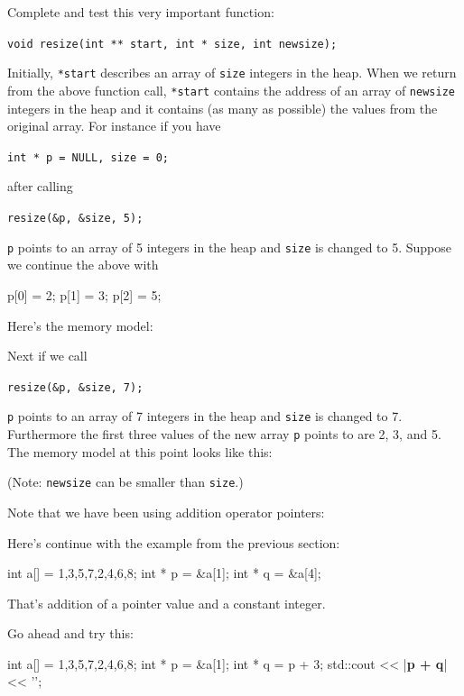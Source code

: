 \begin{ex}
Complete and test this very important function:

\verb!void resize(int ** start, int * size, int newsize);!

Initially, \texttt{*start} describes an array of \texttt{size} integers in
the heap. When we return from the above function call, \texttt{*start}
contains the address of an array of \texttt{newsize} integers in the heap
and it contains (as many as possible) the values from the original
array. For instance if you have

\verb!int * p = NULL, size = 0;!

after calling

\verb!resize(&p, &size, 5);!

\texttt{p} points to an array of 5 integers in the heap and \texttt{size} is
changed to 5. Suppose we continue the above with

\begin{consolethree}[escapeinside=||]
p[0] = 2;
p[1] = 3;
p[2] = 5;
\end{consolethree}

Here's the memory model:

Next if we call

\verb!resize(&p, &size, 7);!

\texttt{p} points to an array of 7 integers in the heap and \texttt{size} is
changed to 7. Furthermore the first three values of the new array
\texttt{p} points to are 2, 3, and 5. The memory model at this point looks
like this:

(Note: \texttt{newsize} can be smaller than \texttt{size}.)
\end{ex}

\newpage{}

Note that we have been using addition operator pointers:

Here's continue with the example from the previous section:

\begin{consolethree}[escapeinside=||]
int a[] = {1,3,5,7,2,4,6,8};
int * p = &a[1];
int * q = &a[4];
\end{consolethree}

That's addition of a pointer value and a constant integer.

Go ahead and try this:

\begin{consolethree}[escapeinside=||]
int a[] = {1,3,5,7,2,4,6,8};
int * p = &a[1];
int * q = p + 3;
std::cout << |{\bf p + q}| << '\n';
\end{consolethree}

